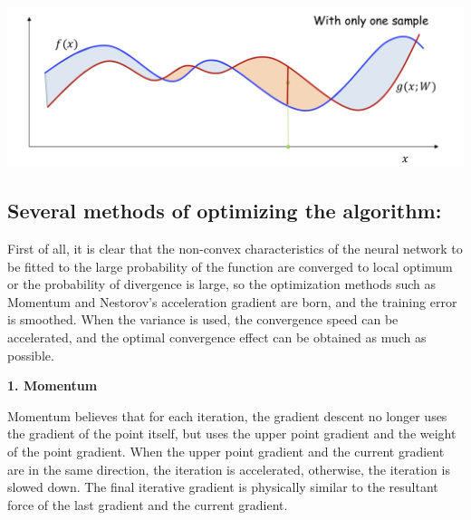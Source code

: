 \documentclass{article}
\begin{document}
	\includegraphics[scale=0.2]{92.png}
	
	\subsection{Several methods of optimizing the algorithm:}
	
	First of all, it is clear that the non-convex characteristics of the neural network to be fitted to the large probability of the function are converged to local optimum or the probability of divergence is large, so the optimization methods such as Momentum and Nestorov's acceleration gradient are born, and the training error is smoothed. When the variance is used, the convergence speed can be accelerated, and the optimal convergence effect can be obtained as much as possible.
	
	\textbf{1. Momentum}
	
	Momentum believes that for each iteration, the gradient descent no longer uses the gradient of the point itself, but uses the upper point gradient and the weight of the point gradient. When the upper point gradient and the current gradient are in the same direction, the iteration is accelerated, otherwise, the iteration is slowed down. The final iterative gradient is physically similar to the resultant force of the last gradient and the current gradient.
	
\end{document}
